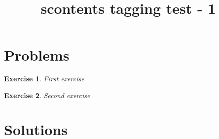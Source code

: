 \documentclass{article}
\title{scontents tagging test - 1}
\newtheorem{ex}{Exercise}
\begin{document}
\section{Problems}
\begin{ex}
First exercise
\end{ex}

\begin{ex}
Second exercise
\end{ex}

\section{Solutions}
\end{document}
